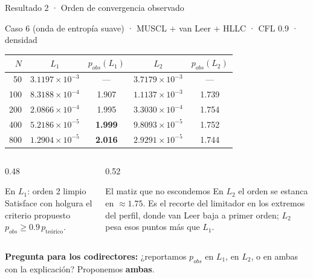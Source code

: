\documentclass[aspectratio=169,10pt]{beamer}
\begin{document}
\begin{frame}[shrink]{Resultado 2 · Orden de convergencia observado}

  \centering
  \small
  Caso 6 (onda de entropía suave) · MUSCL + van Leer + HLLC · CFL 0.9 · densidad

  \vspace{0.4em}
  \begin{tabular}{@{}rcccc@{}}
    \toprule
    $N$ & $L_1$ & $p_{obs}(L_1)$ & $L_2$ & $p_{obs}(L_2)$ \\
    \midrule
     50 & $3.1197\times10^{-3}$ & ---            & $3.7179\times10^{-3}$ & --- \\
    100 & $8.3188\times10^{-4}$ & 1.907          & $1.1137\times10^{-3}$ & 1.739 \\
    200 & $2.0866\times10^{-4}$ & 1.995          & $3.3030\times10^{-4}$ & 1.754 \\
    400 & $5.2186\times10^{-5}$ & \textbf{1.999} & $9.8093\times10^{-5}$ & 1.752 \\
    800 & $1.2904\times10^{-5}$ & \textbf{2.016} & $2.9291\times10^{-5}$ & 1.744 \\
    \bottomrule
  \end{tabular}

  \vspace{0.6em}
  \begin{columns}[t]
    \begin{column}{0.48\textwidth}
      \begin{exampleblock}{En $L_1$: orden 2 limpio}
        \scriptsize
        Satisface con holgura el criterio propuesto
        $p_{obs} \ge 0.9\,p_{\text{teórico}}$.
      \end{exampleblock}
    \end{column}
    \begin{column}{0.52\textwidth}
      \begin{alertblock}{El matiz que no escondemos}
        \scriptsize
        En $L_2$ el orden se estanca en $\approx 1.75$. Es el recorte del limitador
        en los extremos del perfil, donde van Leer baja a primer orden; $L_2$ pesa
        esos puntos más que $L_1$.
      \end{alertblock}
    \end{column}
  \end{columns}

  \vspace{0.2em}
  {\small\textbf{Pregunta para los codirectores:} ¿reportamos $p_{obs}$ en $L_1$,
   en $L_2$, o en ambas con la explicación? Proponemos \textbf{ambas}.}
\end{frame}
\end{document}
